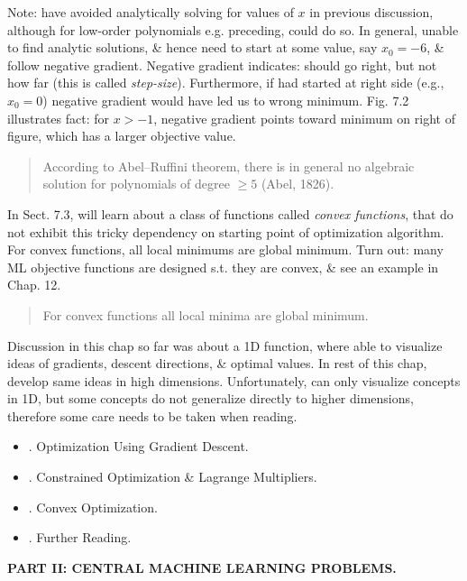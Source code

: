 \documentclass{article}
\begin{document}
\begin{itemize}
	Note: have avoided analytically solving for values of $x$ in previous discussion, although for low-order polynomials e.g. preceding, could do so. In general, unable to find analytic solutions, \& hence need to start at some value, say $x_0 = -6$, \& follow negative gradient. Negative gradient indicates: should go right, but not how far (this is called {\it step-size}). Furthermore, if had started at right side (e.g., $x_0 = 0$) negative gradient would have led us to wrong minimum. Fig. 7.2 illustrates fact: for $x > -1$, negative gradient points toward minimum on right of figure, which has a larger objective value.
	\begin{quote}
		According to Abel--Ruffini theorem, there is in general no algebraic solution for polynomials of degree $\ge5$ (Abel, 1826).
	\end{quote}
	In Sect. 7.3, will learn about a class of functions called {\it convex functions}, that do not exhibit this tricky dependency on starting point of optimization algorithm. For convex functions, all local minimums are global minimum. Turn out: many ML objective functions are designed s.t. they are convex, \& see an example in Chap. 12.
	\begin{quote}
		For convex functions all local minima are global minimum.
	\end{quote}
	Discussion in this chap so far was about a 1D function, where able to visualize ideas of gradients, descent directions, \& optimal values. In rest of this chap, develop same ideas in high dimensions. Unfortunately, can only visualize concepts in 1D, but some concepts do not generalize directly to higher dimensions, therefore some care needs to be taken when reading.
	\begin{itemize}
		\item {. Optimization Using Gradient Descent.}
		\item {. Constrained Optimization \& Lagrange Multipliers.}
		\item {. Convex Optimization.}
		\item {. Further Reading.}
	\end{itemize}
\end{itemize}
{\bf PART II: CENTRAL MACHINE LEARNING PROBLEMS.}
\end{document}
